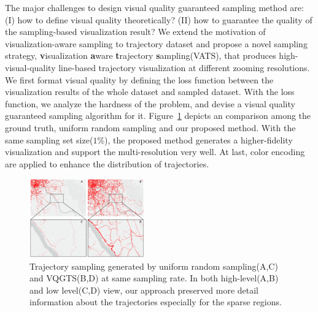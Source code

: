 The major challenges to design visual quality guaranteed sampling method are:
(I) how to define visual quality theoretically? (II) how to guarantee the quality of the sampling-based visualization result?
We extend the motivation of visualization-aware sampling to trajectory dataset and propose a novel sampling strategy, \textbf{v}isualization \textbf{a}ware \textbf{t}rajectory \textbf{s}ampling(VATS), that produces high-visual-quality line-based trajectory visualization at different zooming resolutions. 
We first format visual quality by defining the loss function between the visualization results of the whole dataset and sampled dataset.
With the loss function, we analyze the hardness of the problem, and devise a visual quality guaranteed sampling algorithm for it.
Figure~\ref{fig:compare} depicts an comparison among the ground truth,  uniform random sampling and our proposed method. With the same sampling set size($1\%$), the proposed method generates a higher-fidelity visualization and support the multi-resolution very well.   
At last, color encoding are applied to enhance the distribution of trajectories. 

\begin{figure}[t]
	\centering
	\includegraphics[width=0.44\textwidth]{pictures/introduction/effectiveness.pdf}
	\vspace{-3mm}
	\caption{Trajectory sampling generated by uniform random sampling(A,C) and VQGTS(B,D) at same sampling rate. In both high-level(A,B) and low level(C,D) view, our approach preserved more detail information about the trajectories especially for the sparse regions.}
	\vspace{-5mm}
	\label{fig:compare}
\end{figure}

